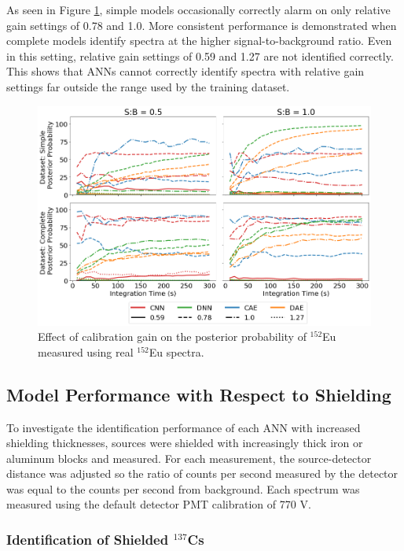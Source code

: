 As seen in Figure \ref{fig:realspectra-cal-eu152}, simple models occasionally correctly alarm on only relative gain settings of 0.78 and 1.0. More consistent performance is demonstrated when complete models identify spectra at the higher signal-to-background ratio. Even in this setting, relative gain settings of 0.59 and 1.27 are not identified correctly. This shows that ANNs cannot correctly identify spectra with relative gain settings far outside the range used by the training dataset.


\begin{figure}[H]
	\centering
	\includegraphics[width=1.0\linewidth]{images/realspectra-cal-eu152}
	\caption{Effect of calibration gain on the posterior probability of $^{152}$Eu measured using real $^{152}$Eu spectra.}
	\label{fig:realspectra-cal-eu152}
\end{figure}

\subsection{Model Performance with Respect to Shielding} \label{real_shielding_performance}

To investigate the identification performance of each ANN with increased shielding thicknesses, sources were shielded with increasingly thick iron or aluminum blocks and measured. For each measurement, the source-detector distance was adjusted so the ratio of counts per second measured by the detector was equal to the counts per second from background. Each spectrum was measured using the default detector PMT calibration of 770 V. 

\subsubsection{Identification of Shielded $^{137}$Cs}


